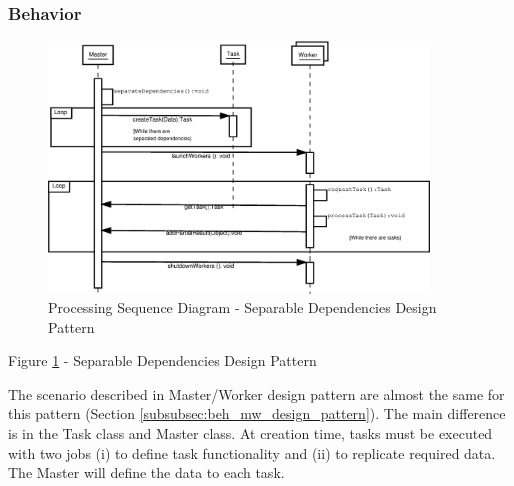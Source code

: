 \subsubsection{Behavior}

\begin{figure}
	\centering
	\includegraphics*[width=0.9\textwidth, keepaspectratio=false]{fig/image22.eps}
	\caption{Processing Sequence Diagram - Separable Dependencies Design Pattern}
	\label{fig:seq_diagram_sd}
\end{figure}


\begin{description}
	\item[Figure \ref{fig:seq_diagram_sd} - Separable Dependencies Design Pattern]
\end{description}

The scenario described in Master/Worker design pattern are almost the same for this pattern (Section \ref{subsubsec:beh_mw_design_pattern}). The main difference is in the Task class and Master class. At creation time, tasks must be executed with two jobs (i) to define task functionality and (ii) to replicate required data. The Master will define the data to each task.

